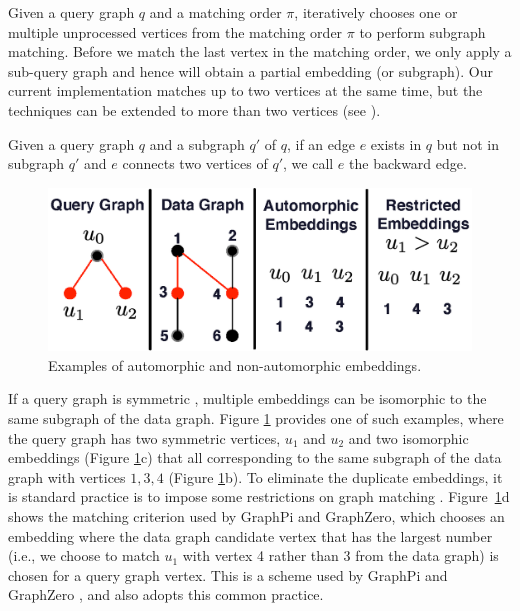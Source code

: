  Given a query graph $q$ and a matching order $\pi$, \SystemName iteratively chooses  one or multiple
unprocessed vertices from the matching order $\pi$ to perform subgraph matching. Before we match the last vertex in the matching order, we
only apply a sub-query graph and hence will obtain a partial embedding (or subgraph). Our current implementation matches up to two vertices
at the same time, but the techniques can be extended to more than two vertices (see ).


 Given a query graph $q$ and a subgraph $q'$ of $q$, if an edge $e$ exists in $q$ but not in subgraph $q'$ and
$e$ connects two vertices of $q'$, we call $e$ the backward edge.

\begin{figure}[t!]
\centering
\includegraphics[width=\columnwidth]{./figure/automorphism.eps}
\caption{Examples of automorphic and non-automorphic embeddings.}	
\label{fig:automo}
\end{figure}

 If a query graph is symmetric \FIXME{\cite{}}, multiple embeddings can be isomorphic to the same
subgraph of the data graph. Figure \ref{fig:automo} provides one of such examples, where the query graph has two symmetric vertices, $u_1$
and $u_2$ and two isomorphic embeddings (Figure \ref{fig:automo}c) that all corresponding to the same subgraph of the data graph with
vertices $1, 3, 4$ (Figure \ref{fig:automo}b). To eliminate the duplicate embeddings, it is standard practice is to impose some
restrictions on graph matching \cite{ mawhirter2019graphzero, shi2020graphpi}. Figure~\ref{fig:automo}d shows the matching criterion used
by GraphPi and GraphZero, which chooses an embedding where the data graph candidate vertex that has the largest number (i.e., we choose to
match $u_1$ with vertex 4 rather than 3 from the data graph) is chosen for a query graph vertex. This is a scheme used by GraphPi
\cite{shi2020graphpi} and GraphZero \cite{mawhirter2019graphzero}, and \SystemName also adopts this common practice.

